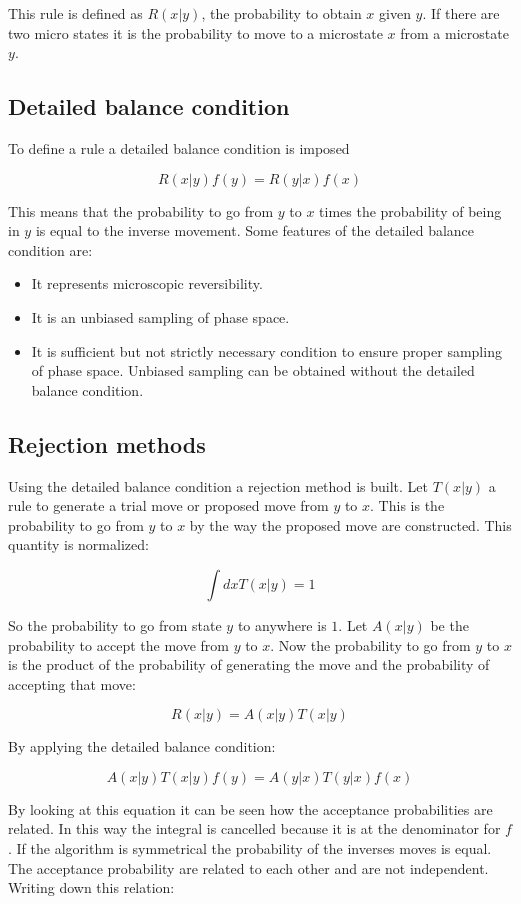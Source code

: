 This rule is defined as $R(x|y)$,  the probability to obtain $x$ given $y$.
If there are two micro states it is the probability to move to a microstate $x$ from a microstate $y$.

	\subsection{Detailed balance condition}
	To define a rule a detailed balance condition is imposed

	$$R(x|y)f(y) = R(y|x)f(x)$$

	This means that the probability to go from $y$ to $x$ times the probability of being in $y$  is equal to the inverse movement.
	Some features of the detailed balance condition are:

	\begin{itemize}
		\item It represents microscopic reversibility.
		\item It is an unbiased sampling of phase space.
		\item It is sufficient but not strictly necessary condition to ensure proper sampling of phase space.
			Unbiased sampling can be obtained without the detailed balance condition.
	\end{itemize}

	\subsection{Rejection methods}
	Using the detailed balance condition a rejection method is built.
	Let $T(x|y)$ a rule to generate a trial move or proposed move from $y$ to $x$.
	This is the probability to go from $y$ to $x$ by the way the proposed move are constructed.
	This quantity is normalized:

	$$\int dxT(x|y) = 1$$

	So the probability to go from state $y$ to anywhere is $1$.
	Let $A(x|y)$ be the probability to accept the move from $y$ to $x$.
	Now the probability to go from $y$ to $x$ is the product of the probability of generating the move and the probability of accepting that move:

	$$R(x|y) = A(x|y)T(x|y)$$

	By applying the detailed balance condition:

	$$A(x|y)T(x|y)f(y) = A(y|x)T(y|x)f(x)$$

	By looking at this equation it can be seen how the acceptance probabilities are related.
	In this way the integral is cancelled because it is at the denominator for $f$.
	If the algorithm is symmetrical the probability of the inverses moves is equal.
	The acceptance probability are related to each other and are not independent.
	Writing down this relation:

